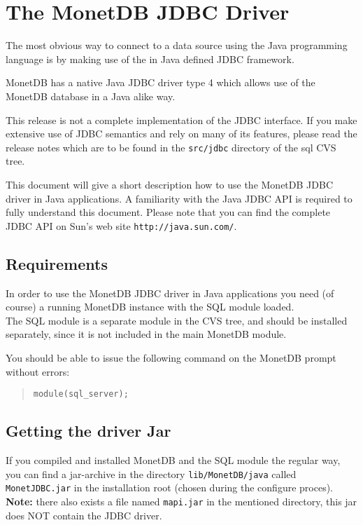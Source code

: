 \documentclass{article}
\begin{document}
\section{The MonetDB JDBC Driver}
The most obvious way to connect to a data source using the Java programming language
is by making use of the in Java defined JDBC framework.

MonetDB has a native Java JDBC driver type 4 which allows use of the MonetDB database in
a Java alike way.

This release is not a complete implementation of the JDBC interface. If you make
extensive use of JDBC semantics and rely on many of its features, please
read the release notes which are to be found in the \texttt{src/jdbc} directory of the sql
CVS tree.

This document will give a short description how to use the MonetDB JDBC driver in
Java applications.  A familiarity with the Java JDBC API is required to fully understand
this document.  Please note that you can find the complete JDBC API on Sun's web site
\texttt{http://java.sun.com/}.

\subsection{Requirements}
In order to use the MonetDB JDBC driver in Java applications you need (of course) a running MonetDB instance with the SQL module loaded.\\
The SQL module is a separate module in the CVS tree, and should be installed separately, since
it is not included in the main MonetDB module.

You should be able to issue the following command on the MonetDB prompt without errors:
\begin{quote}
\texttt{module(sql\_server);}
\end{quote}

\subsection{Getting the driver Jar}
If you compiled and installed MonetDB and the SQL module the regular way, you can find a
jar-archive in the directory \texttt{lib/MonetDB/java} called \texttt{MonetJDBC.jar} in the
installation root (chosen during the configure proces).\\
\textbf{Note:} there also exists a file named \texttt{mapi.jar} in the mentioned directory, this
jar does NOT contain the JDBC driver.
\end{document}
